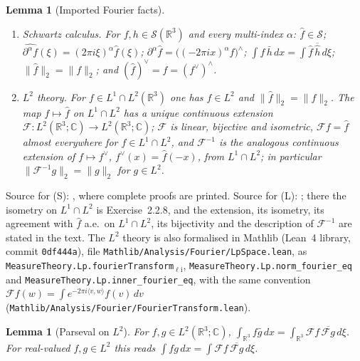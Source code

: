 \documentclass[11pt]{article}
\newtheorem{lemma}[theorem]{Lemma}
\theoremstyle{definition}
\theoremstyle{plain}
\newcommand{\R}{\mathbb R}
\begin{document}
\begin{lemma}[Imported Fourier facts]\label{lem:fourier}
\begin{enumerate}
\item[(S)] \emph{Schwartz calculus.}  For $f,h\in\mathcal S(\R^3)$ and every
multi-index $\alpha$: $\hat f\in\mathcal S$;
$\widehat{\partial^\alpha f}(\xi)=(2\pi i\xi)^\alpha\hat f(\xi)$;
$\partial^\alpha\hat f=\bigl((-2\pi ix)^\alpha f\bigr)^{\wedge}$;
$\int f\,\bar h\,dx=\int\hat f\,\overline{\hat h}\,d\xi$;
$\|\hat f\|_2=\|f\|_2$; and $(\hat f)^\vee=f=(f^\vee)^\wedge$.
\item[(L)] \emph{$L^2$ theory.}  For $f\in L^1\cap L^2(\R^3)$ one has
$\hat f\in L^2$ and $\|\hat f\|_2=\|f\|_2$.  The map $f\mapsto\hat f$ on
$L^1\cap L^2$ has a unique continuous extension
$\mathcal F\colon L^2(\R^3;\mathbb C)\to L^2(\R^3;\mathbb C)$; $\mathcal F$ is linear,
bijective and isometric, $\mathcal Ff=\hat f$ almost everywhere for
$f\in L^1\cap L^2$, and $\mathcal F^{-1}$ is the analogous continuous
extension of $f\mapsto f^\vee$, $f^\vee(x)=\hat f(-x)$, from $L^1\cap L^2$;
in particular $\|\mathcal F^{-1}g\|_2=\|g\|_2$ for $g\in L^2$.
\end{enumerate}
\end{lemma}

\begin{sloppypar}
Source for (S): \cite[Proposition~2.2.11 (9), (10), (11), pp.~109--110,
and Theorem~2.2.14 (2), (3), (4), p.~112]{Grafakos2014}, where complete
proofs are printed.  Source for (L): \cite[\S2.2.4, pp.~113--114]{Grafakos2014};
there the isometry on $L^1\cap L^2$ is Exercise~2.2.8, and the extension,
its isometry, its agreement with $\hat f$ a.e.\ on $L^1\cap L^2$, its
bijectivity and the description of $\mathcal F^{-1}$ are stated in the text.
The $L^2$ theory is also formalised in Mathlib (Lean~4 library, commit
\texttt{0df444a}), file
\texttt{Mathlib/\allowbreak Analysis/\allowbreak Fourier/\allowbreak LpSpace.lean},
as \texttt{MeasureTheory.Lp.\allowbreak fourierTransform}$_{\ell\mathrm i}$,
\texttt{MeasureTheory.Lp.\allowbreak norm\_fourier\_eq} and
\texttt{MeasureTheory.Lp.\allowbreak inner\_fourier\_eq}, with the
same convention $\mathcal Ff(w)=\int e^{-2\pi i\langle v,w\rangle}f(v)\,dv$
(\texttt{Mathlib/\allowbreak Analysis/\allowbreak Fourier/\allowbreak FourierTransform.lean}).
\end{sloppypar}

\begin{lemma}[Parseval on $L^2$]\label{lem:parseval}
For $f,g\in L^2(\R^3;\mathbb C)$,
$\int_{\R^3}f\bar g\,dx=\int_{\R^3}\mathcal Ff\,\overline{\mathcal Fg}\,d\xi$.
For real-valued $f,g\in L^2$ this reads
$\int fg\,dx=\int\mathcal Ff\,\overline{\mathcal Fg}\,d\xi$.
\end{lemma}
\end{document}
